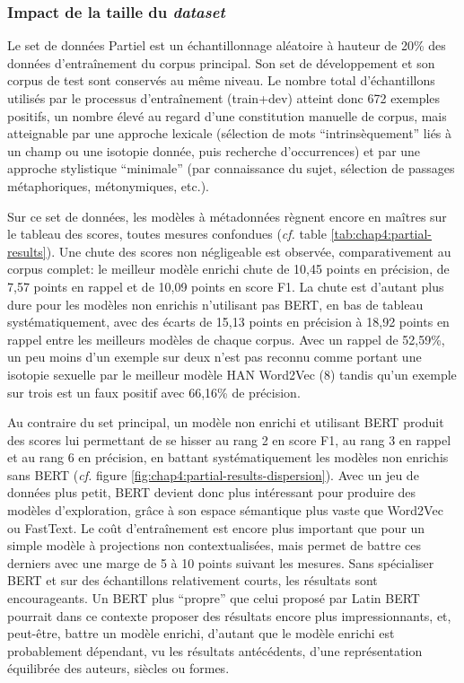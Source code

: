 \subsubsection{Impact de la taille du \textit{dataset}}

Le set de données Partiel est un échantillonnage aléatoire à hauteur de 20\% des données d'entraînement du corpus principal. Son set de développement et son corpus de test sont conservés au même niveau. Le nombre total d'échantillons utilisés par le processus d'entraînement (train+dev) atteint donc 672 exemples positifs, un nombre élevé au regard d'une constitution manuelle de corpus, mais atteignable par une approche lexicale (sélection de mots ``intrinsèquement'' liés à un champ ou une isotopie donnée, puis recherche d'occurrences) et par une approche stylistique ``minimale'' (par connaissance du sujet, sélection de passages métaphoriques, métonymiques, etc.).

Sur ce set de données, les modèles à métadonnées règnent encore en maîtres sur le tableau des scores, toutes mesures confondues (\textit{cf.} table \ref{tab:chap4:partial-results}). Une chute des scores non négligeable est observée, comparativement au corpus complet: le meilleur modèle enrichi chute de 10,45 points en précision, de 7,57 points en rappel et de 10,09 points en score F1. La chute est d'autant plus dure pour les modèles non enrichis n'utilisant pas BERT, en bas de tableau systématiquement, avec des écarts de 15,13 points en précision à 18,92 points en rappel entre les meilleurs modèles de chaque corpus. Avec un rappel de 52,59\%, un peu moins d'un exemple sur deux n'est pas reconnu comme portant une isotopie sexuelle par le meilleur modèle HAN Word2Vec (8) tandis qu'un exemple sur trois est un faux positif avec 66,16\% de précision.

Au contraire du set principal, un modèle non enrichi et utilisant BERT produit des scores lui permettant de se hisser au rang 2 en score F1, au rang 3 en rappel et au rang 6 en précision, en battant systématiquement les modèles non enrichis sans BERT (\textit{cf.} figure \ref{fig:chap4:partial-results-dispersion}). Avec un jeu de données plus petit, BERT devient donc plus intéressant pour produire des modèles d'exploration, grâce à son espace sémantique plus vaste que Word2Vec ou FastText. Le coût d'entraînement est encore plus important que pour un simple modèle à projections non contextualisées, mais permet de battre ces derniers avec une marge de 5 à 10 points suivant les mesures. Sans spécialiser BERT et sur des échantillons relativement courts, les résultats sont encourageants. Un BERT plus ``propre'' que celui proposé par Latin BERT pourrait dans ce contexte proposer des résultats encore plus impressionnants, et, peut-être, battre un modèle enrichi, d'autant que le modèle enrichi est probablement dépendant, vu les résultats antécédents, d'une représentation équilibrée des auteurs, siècles ou formes.


